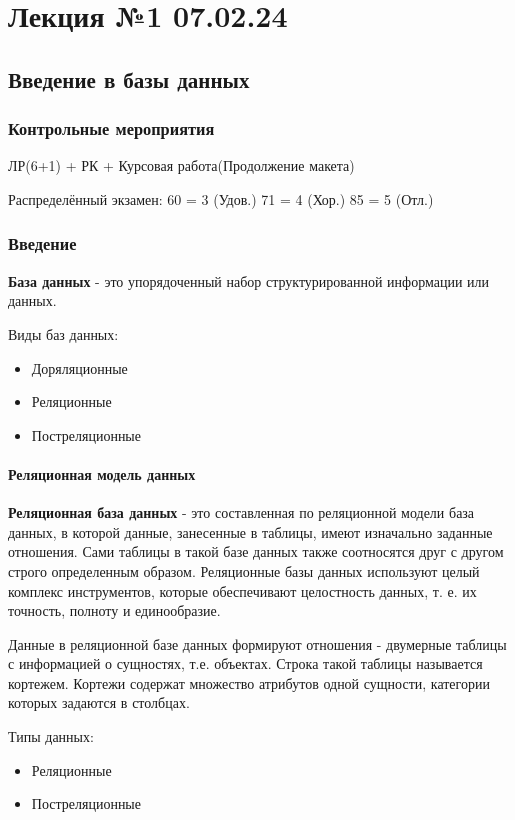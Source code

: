 \part{Лекция №1 07.02.24}

\chapter{Введение в базы данных}

\section{Контрольные мероприятия}

ЛР(6+1) + РК + Курсовая работа(Продолжение макета)

Распределённый экзамен:
60 = 3 (Удов.)
71 = 4 (Хор.)
85 = 5 (Отл.)

\section{Введение}

\textbf{База данных}  - это упорядоченный набор структурированной информации или данных.

Виды баз данных:
\begin{itemize}
    \item Доряляционные
    \item Реляционные
    \item Постреляционные
\end{itemize}

\subsection{Реляционная модель данных}

\textbf{Реляционная база данных} - это составленная по реляционной модели база данных, в которой данные, занесенные в таблицы, имеют изначально заданные отношения. Сами таблицы в такой базе данных также соотносятся друг с другом строго определенным образом. Реляционные базы данных используют целый комплекс инструментов, которые обеспечивают целостность данных, т. е. их точность, полноту и единообразие.

Данные в реляционной базе данных формируют отношения - двумерные таблицы с информацией о сущностях, т.е. объектах. Строка такой таблицы называется кортежем. Кортежи содержат множество атрибутов одной сущности, категории которых задаются в столбцах.

Типы данных:
\begin{itemize}
    \item Реляционные
    \item Постреляционные
\end{itemize}

